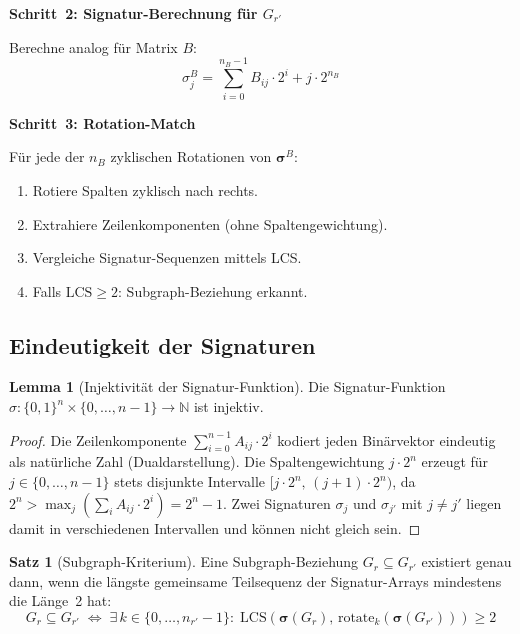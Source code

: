 ﻿\documentclass[a4paper,12pt]{article}
\theoremstyle{definition}
\newtheorem{satz}{Satz}
\newtheorem{lemma}{Lemma}
\begin{document}
\textbf{Schritt~2: Signatur-Berechnung f\"ur $G_{r'}$}

Berechne analog f\"ur Matrix $B$:
\[
  \sigma_j^B = \sum_{i=0}^{n_B-1} B_{ij} \cdot 2^i + j \cdot 2^{n_B}
\]

\textbf{Schritt~3: Rotation-Match}

F\"ur jede der $n_B$ zyklischen Rotationen von $\boldsymbol{\sigma}^B$:
\begin{enumerate}
  \item Rotiere Spalten zyklisch nach rechts.
  \item Extrahiere Zeilenkomponenten (ohne Spaltengewichtung).
  \item Vergleiche Signatur-Sequenzen mittels LCS.
  \item Falls $\mathrm{LCS} \geq 2$: Subgraph-Beziehung erkannt.
\end{enumerate}

\subsection{Eindeutigkeit der Signaturen}

\begin{lemma}[Injektivit\"at der Signatur-Funktion]
  \label{lem:injektivitaet}
  Die Signatur-Funktion $\sigma: \{0,1\}^n \times \{0,\ldots,n-1\} \to \mathbb{N}$
  ist injektiv.
\end{lemma}

\begin{proof}
  Die Zeilenkomponente $\sum_{i=0}^{n-1} A_{ij} \cdot 2^i$ kodiert jeden
  Bin\"arvektor eindeutig als nat\"urliche Zahl (Dualdarstellung).
  Die Spaltengewichtung $j \cdot 2^n$ erzeugt f\"ur
  $j \in \{0,\ldots,n-1\}$ stets disjunkte Intervalle $[j\cdot2^n,\,(j+1)\cdot2^n)$,
  da $2^n > \max_j(\sum_{i} A_{ij}\cdot2^i) = 2^n - 1$.
  Zwei Signaturen $\sigma_j$ und $\sigma_{j'}$ mit $j \neq j'$ liegen damit in
  verschiedenen Intervallen und k\"onnen nicht gleich sein. \qedhere
\end{proof}

\begin{satz}[Subgraph-Kriterium]
  Eine Subgraph-Beziehung $G_r \subseteq G_{r'}$ existiert genau dann, wenn die
  l\"angste gemeinsame Teilsequenz der Signatur-Arrays mindestens die L\"ange~2 hat:
  \[
    G_r \subseteq G_{r'} \;\iff\;
    \exists\, k \in \{0,\ldots,n_{r'}-1\}:\;
    \mathrm{LCS}\!\left(\boldsymbol{\sigma}(G_r),\,
    \mathrm{rotate}_k(\boldsymbol{\sigma}(G_{r'}))\right) \geq 2
  \]
\end{satz}
\end{document}
